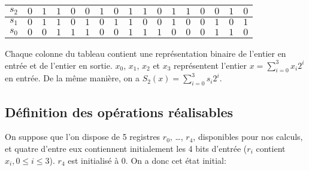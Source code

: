 \documentclass{article}
\begin{document}
\begin{center}
\begin{tabular}{|l|l|l|l|l|l|l|l|l|l|l|l|l|l|l|l|l|}
\hline
\multicolumn{1}{|l|}{ $s_{2}$}&	\multicolumn{1}{|l|}{ $0$}&	\multicolumn{1}{|l|}{ $1$}&	\multicolumn{1}{|l|}{ $1$}&	\multicolumn{1}{|l|}{ $0$}&	\multicolumn{1}{|l|}{ $0$}&	\multicolumn{1}{|l|}{ $1$}&	\multicolumn{1}{|l|}{ $0$}&	\multicolumn{1}{|l|}{ $1$}&	\multicolumn{1}{|l|}{ $1$}&	\multicolumn{1}{|l|}{ $0$}&	\multicolumn{1}{|l|}{ $1$}&	\multicolumn{1}{|l|}{ $1$}&	\multicolumn{1}{|l|}{ $0$}&	\multicolumn{1}{|l|}{ $0$}&	\multicolumn{1}{|l|}{ $1$}&	\multicolumn{1}{|l|}{ $0$}	\\
\hline
\multicolumn{1}{|l|}{ $s_{1}$}&	\multicolumn{1}{|l|}{ $0$}&	\multicolumn{1}{|l|}{ $1$}&	\multicolumn{1}{|l|}{ $1$}&	\multicolumn{1}{|l|}{ $0$}&	\multicolumn{1}{|l|}{ $1$}&	\multicolumn{1}{|l|}{ $0$}&	\multicolumn{1}{|l|}{ $1$}&	\multicolumn{1}{|l|}{ $1$}&	\multicolumn{1}{|l|}{ $0$}&	\multicolumn{1}{|l|}{ $0$}&	\multicolumn{1}{|l|}{ $1$}&	\multicolumn{1}{|l|}{ $0$}&	\multicolumn{1}{|l|}{ $0$}&	\multicolumn{1}{|l|}{ $1$}&	\multicolumn{1}{|l|}{ $0$}&	\multicolumn{1}{|l|}{ $1$}	\\
\hline
\multicolumn{1}{|l|}{ $s_{0}$}&	\multicolumn{1}{|l|}{ $0$}&	\multicolumn{1}{|l|}{ $0$}&	\multicolumn{1}{|l|}{ $1$}&	\multicolumn{1}{|l|}{ $1$}&	\multicolumn{1}{|l|}{ $1$}&	\multicolumn{1}{|l|}{ $0$}&	\multicolumn{1}{|l|}{ $0$}&	\multicolumn{1}{|l|}{ $1$}&	\multicolumn{1}{|l|}{ $1$}&	\multicolumn{1}{|l|}{ $1$}&	\multicolumn{1}{|l|}{ $0$}&	\multicolumn{1}{|l|}{ $0$}&	\multicolumn{1}{|l|}{ $0$}&	\multicolumn{1}{|l|}{ $1$}&	\multicolumn{1}{|l|}{ $1$}&	\multicolumn{1}{|l|}{ $0$}	\\
\hline
\end{tabular}

\end{center}
\medbreak

Chaque colonne du tableau contient une représentation binaire de l'entier en entrée et de l'entier en sortie. $x_{0}$, $x_{1}$, $x_{2}$ et $x_{3}$ représentent l'entier $x = \sum_{i=0}^{3} x_{i} 2^{i}$ en entrée. De la même manière, on a $S_2(x) = \sum_{i=0}^{3} s_{i} 2^{i}$.

\subsection{Définition des opérations réalisables}

On suppose que l'on dispose de 5 registres $r_{0}$, \ldots, $r_{4}$, disponibles pour nos calculs, et quatre d'entre eux contiennent initialement les 4 bits d'entrée ($r_{i}$ contient $x_{i}, 0\leq i\leq 3$). $r_{4}$ est initialisé à 0. On a donc cet état initial:
\end{document}
